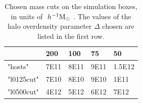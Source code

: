 \documentclass[usenatbib,usegraphicx,letterpaper]{mn2e}
\begin{document}
\begin{table}[]
\centering
\caption{Chosen mass cuts on the simulation boxes, in units of $\ h^{-1}\mathrm{M}_{\odot}~$. The values of the halo overdensity parameter $\Delta$ chosen are listed in the first row.}
\label{my-label}
\begin{tabular}{l | l | l | l | l}
           & 200  & 100  & 75   & 50     \\ \hline
"hosts"    & 7E11 & 8E11 & 9E11 & 1.5E12 \\
"l0125cut" & 7E10 & 8E10 & 9E10 & 1E11   \\
"l0500cut" & 4E12 & 5E12 & 6E12 & 7E12  
\end{tabular}
\end{table}

\begin{figure}
	\centering
	\\

\end{figure}
\end{document}
